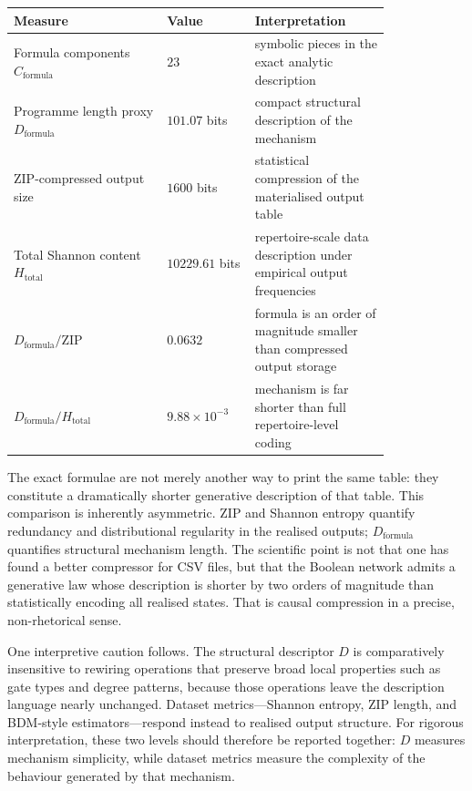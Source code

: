 \documentclass[11pt]{article}
\theoremstyle{definition}
\begin{document}
\begin{center}
\begin{tabular}{p{0.34\linewidth}p{0.18\linewidth}p{0.30\linewidth}}
\toprule
\textbf{Measure} & \textbf{Value} & \textbf{Interpretation} \\
\midrule
Formula components \(C_{\mathrm{formula}}\) & \(23\)
  & symbolic pieces in the exact analytic description \\
Programme length proxy \(D_{\mathrm{formula}}\) & \(101.07\) bits
  & compact structural description of the mechanism \\
ZIP-compressed output size & \(1600\) bits
  & statistical compression of the materialised output table \\
Total Shannon content \(H_{\mathrm{total}}\) & \(10229.61\) bits
  & repertoire-scale data description under empirical output frequencies \\
\(D_{\mathrm{formula}}/\mathrm{ZIP}\) & \(0.0632\)
  & formula is an order of magnitude smaller than compressed output storage \\
\(D_{\mathrm{formula}}/H_{\mathrm{total}}\) & \(9.88\times10^{-3}\)
  & mechanism is far shorter than full repertoire-level coding \\
\bottomrule
\end{tabular}
\end{center}

The exact formulae are not merely another way to print the same table: they constitute a
dramatically shorter generative description of that table. This comparison is inherently asymmetric.
ZIP and Shannon entropy quantify redundancy and distributional regularity in the realised outputs;
\(D_{\mathrm{formula}}\) quantifies structural mechanism length. The scientific point is not that
one has found a better compressor for CSV files, but that the Boolean network admits a generative
law whose description is shorter by two orders of magnitude than statistically encoding all realised
states. That is causal compression in a precise, non-rhetorical sense.

One interpretive caution follows. The structural descriptor \(D\) is comparatively insensitive to
rewiring operations that preserve broad local properties such as gate types and degree patterns,
because those operations leave the description language nearly unchanged. Dataset metrics---Shannon
entropy, ZIP length, and BDM-style estimators---respond instead to realised output structure. For
rigorous interpretation, these two levels should therefore be reported together: \(D\) measures
mechanism simplicity, while dataset metrics measure the complexity of the behaviour generated by
that mechanism.
\end{document}
